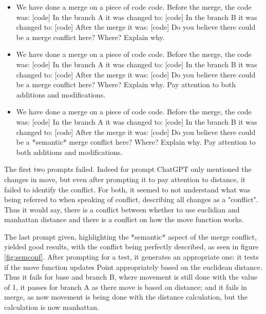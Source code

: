 \begin{itemize}
  \item We have done a merge on a piece of code code.
Before the merge, the code was: [code]
In the branch A it was changed to: [code]
In the branch B it was changed to: [code]
After the merge it was: [code]
Do you believe there could be a merge conflict here? Where? Explain why.
  \item We have done a merge on a piece of code code.
Before the merge, the code was: [code]
In the branch A it was changed to: [code]
In the branch B it was changed to: [code]
After the merge it was: [code]
Do you believe there could be a merge conflict here? Where? Explain why. Pay attention to both additions and modifications.
  \item We have done a merge on a piece of code code.
Before the merge, the code was: [code]
In the branch A it was changed to: [code]
In the branch B it was changed to: [code]
After the merge it was: [code]
Do you believe there could be a *semantic* merge conflict here? Where? Explain why. Pay attention to both additions and modifications.

\end{itemize}

The first two prompts failed. Indeed for prompt ChatGPT only mentioned the changes in move, but even after prompting it to pay attention to distance, it failed to identify the conflict. For both, it seemed to not understand what was being referred to when speaking of conflict, describing all changes as a "conflict". Thus it would say, there is a conflict between whether to use euclidian and manhattan distance and there is a conflict on how the move function works.

The last prompt given, highlighting the *semantic* aspect of the merge conflict, yielded good results, with the conflict being perfectly described, as seen in figure \ref{fig:semconf}. After prompting for a test, it generates an appropriate one: it tests if the move function updates Point appropriately based on the euclidean distance. Thus it fails for base and branch B, where movement is still done with the value of 1, it passes for branch A as there move is based on distance; and it fails in merge, as now movement is being done with the distance calculation, but the calculation is now manhattan.

